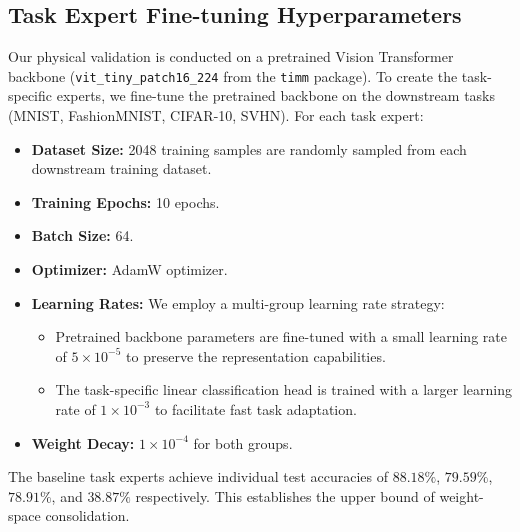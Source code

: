 \subsection{Task Expert Fine-tuning Hyperparameters}
Our physical validation is conducted on a pretrained Vision Transformer backbone (\texttt{vit\_tiny\_patch16\_224} from the \texttt{timm} package). To create the task-specific experts, we fine-tune the pretrained backbone on the downstream tasks (MNIST, FashionMNIST, CIFAR-10, SVHN).
For each task expert:
\begin{itemize}
    \item \textbf{Dataset Size:} 2048 training samples are randomly sampled from each downstream training dataset.
    \item \textbf{Training Epochs:} 10 epochs.
    \item \textbf{Batch Size:} 64.
    \item \textbf{Optimizer:} AdamW optimizer.
    \item \textbf{Learning Rates:} We employ a multi-group learning rate strategy:
        \begin{itemize}
            \item Pretrained backbone parameters are fine-tuned with a small learning rate of $5 \times 10^{-5}$ to preserve the representation capabilities.
            \item The task-specific linear classification head is trained with a larger learning rate of $1 \times 10^{-3}$ to facilitate fast task adaptation.
        \end{itemize}
    \item \textbf{Weight Decay:} $1 \times 10^{-4}$ for both groups.
\end{itemize}
The baseline task experts achieve individual test accuracies of $88.18\%$, $79.59\%$, $78.91\%$, and $38.87\%$ respectively. This establishes the upper bound of weight-space consolidation.

